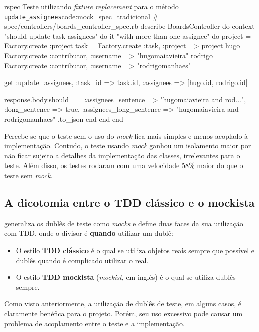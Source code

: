 \begin{mycode}{rspec}%
{Teste utilizando \textit{fixture replacement} para o método \texttt{update\_assignees}}{code:mock_spec_tradicional}
# spec/controllers/boards_controller_spec.rb
describe BoardsController do
  context "should update task assignees" do
    it "with more than one assignee" do
      project = Factory.create :project
      task = Factory.create :task, :project => project
      hugo = Factory.create :contributor, :username => "hugomaiavieira"
      rodrigo = Factory.create :contributor, :username => "rodrigomanhaes"

      get :update_assignees, :task_id => task.id, :assignees => [hugo.id, rodrigo.id]

      response.body.should ==
        { :assignees_sentence => "hugomaiavieira and rod...",
          :long_sentence => true,
          :assignees_long_sentence => "hugomaiavieira and rodrigomanhaes" }.to_json
    end
  end
end
\end{mycode}

Percebe-se que o teste sem o uso do \textit{mock} fica mais simples e menos acoplado à implementação. Contudo, o teste usando \textit{mock} ganhou um isolamento maior por não ficar sujeito a detalhes da implementação das classes, irrelevantes para o teste. Além disso, os testes rodaram com uma velocidade 58\% maior do que o teste sem \textit{mock}.


\subsection{A dicotomia entre o TDD clássico e o mockista}
\label{sub:tdd_classico_e_mockista}

 generaliza os dublês de teste como \textit{mocks} e define duas faces da sua utilização com TDD, onde o divisor é \textbf{quando} utilizar um dublê:

\begin{itemize}
  \item O estilo \textbf{TDD clássico} é o qual se utiliza objetos reais sempre que possível e dublês quando é complicado utilizar o real.

  \item O estilo \textbf{TDD mockista} (\textit{mockist}, em inglês) é o qual se utiliza dublês sempre.
\end{itemize}

Como visto anteriormente, a utilização de dublês de teste, em alguns casos, é claramente benéfica para o projeto. Porém, seu uso excessivo pode causar um problema de acoplamento entre o teste e a implementação.

